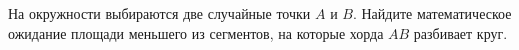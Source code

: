 \documentclass{article}
\begin{document}
На окружности выбираются две случайные точки $A$ и $B$. Найдите математическое ожидание площади меньшего из сегментов,
на которые хорда $AB$ разбивает круг.
\end{document}
